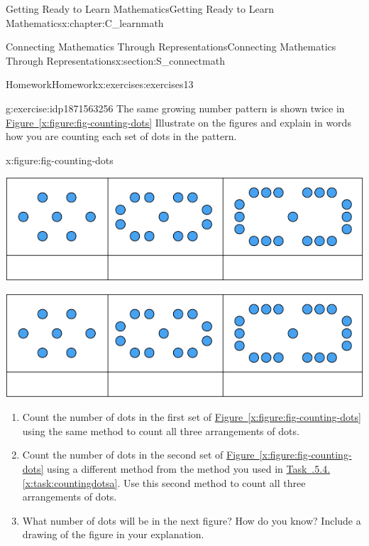 \documentclass[oneside,10pt,]{book}
\newcommand{\xreffont}{\relax}
\numberwithin{equation}{chapter}
\begin{document}
\begin{chapterptx}{Getting Ready to Learn Mathematics}{}{Getting Ready to Learn Mathematics}{}{}{x:chapter:C_learnmath}
\begin{sectionptx}{Connecting Mathematics Through Representations}{}{Connecting Mathematics Through Representations}{}{}{x:section:S_connectmath}
\begin{exercises-subsection}{Homework}{}{Homework}{}{}{x:exercises:exercises13}
\begin{divisionexercise}{4}{}{}{g:exercise:idp1871563256}
The same growing number pattern is shown twice in \hyperref[x:figure:fig-counting-dots]{Figure~{\xreffont\ref{x:figure:fig-counting-dots}}} Illustrate on the figures and explain in words how you are counting each set of dots in the pattern.%
\begin{figureptx}{}{x:figure:fig-counting-dots}{}%
\begin{image}{0.15}{0.7}{0.15}%
\includegraphics[width=\linewidth]{external/counting-dots.pdf}
\end{image}%
\begin{image}{0.15}{0.7}{0.15}%
\includegraphics[width=\linewidth]{external/counting-dots.pdf}
\end{image}%
\tcblower
\end{figureptx}%
\begin{enumerate}[font=\bfseries,label=(\alph*),ref=\alph*]
\item\label{x:task:countingdotsa}Count the number of dots in the first set of \hyperref[x:figure:fig-counting-dots]{Figure~{\xreffont\ref{x:figure:fig-counting-dots}}} using the same method to count all three arrangements of dots.%
\item{}Count the number of dots in the second set of \hyperref[x:figure:fig-counting-dots]{Figure~{\xreffont\ref{x:figure:fig-counting-dots}}} using a different method from the method you used in \hyperref[x:task:countingdotsa]{Task~{\xreffont 1.3.5.4}.{\xreffont\ref{x:task:countingdotsa}}}. Use this second method to count all three arrangements of dots.%
\item{}What number of dots will be in the next figure? How do you know? Include a drawing of the figure in your explanation.%
\end{enumerate}
\end{divisionexercise}%

\end{exercises-subsection}
\end{sectionptx}
\end{chapterptx}
\end{document}
